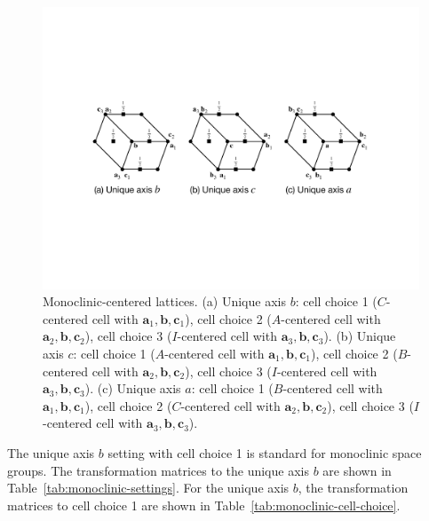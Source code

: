 \begin{figure}[htb]
  \centering
  \includegraphics[width=\textwidth]{figure/fig_monoclinic_settings_cell_choices.pdf}
  \caption{
    Monoclinic-centered lattices.
    (a) Unique axis $b$:
      cell choice 1 ($C$-centered cell with $\bm{a}_{1}, \bm{b}, \bm{c}_{1}$),
      cell choice 2 ($A$-centered cell with $\bm{a}_{2}, \bm{b}, \bm{c}_{2}$),
      cell choice 3 ($I$-centered cell with $\bm{a}_{3}, \bm{b}, \bm{c}_{3}$).
    (b) Unique axis $c$:
      cell choice 1 ($A$-centered cell with $\bm{a}_{1}, \bm{b}, \bm{c}_{1}$),
      cell choice 2 ($B$-centered cell with $\bm{a}_{2}, \bm{b}, \bm{c}_{2}$),
      cell choice 3 ($I$-centered cell with $\bm{a}_{3}, \bm{b}, \bm{c}_{3}$).
    (c) Unique axis $a$:
      cell choice 1 ($B$-centered cell with $\bm{a}_{1}, \bm{b}, \bm{c}_{1}$),
      cell choice 2 ($C$-centered cell with $\bm{a}_{2}, \bm{b}, \bm{c}_{2}$),
      cell choice 3 ($I$-centered cell with $\bm{a}_{3}, \bm{b}, \bm{c}_{3}$).
  }
  \label{fig:monoclinic-choices}
\end{figure}

The unique axis $b$ setting with cell choice 1 is standard for monoclinic space groups.
The transformation matrices to the unique axis $b$ are shown in Table~\ref{tab:monoclinic-settings}.
For the unique axis $b$, the transformation matrices to cell choice 1 are shown in Table~\ref{tab:monoclinic-cell-choice}.

